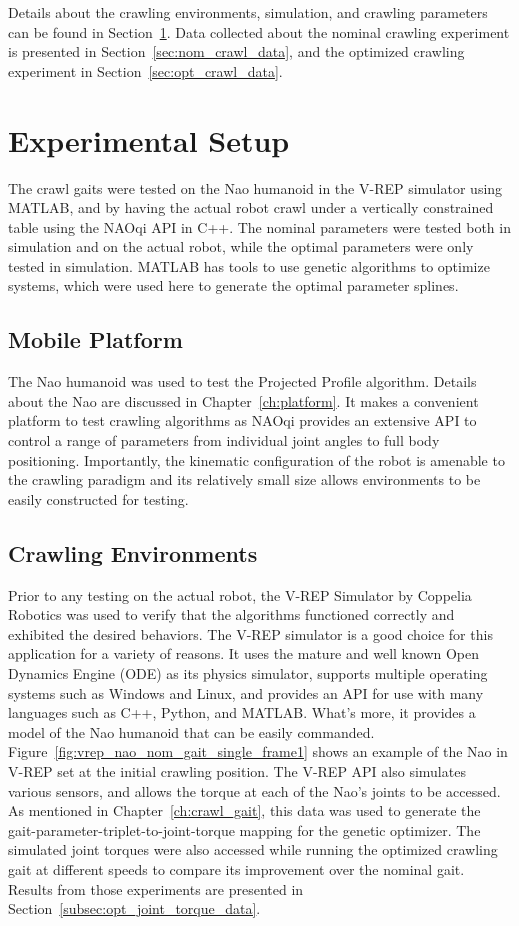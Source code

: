 Details about the crawling environments, simulation, and crawling parameters can be found in
Section~\ref{sec:crawl_exp_setup}. Data collected about the nominal crawling experiment is
presented in Section~\ref{sec:nom_crawl_data}, and the optimized crawling experiment in 
Section~\ref{sec:opt_crawl_data}.

\FloatBarrier
\section{Experimental Setup} \label{sec:crawl_exp_setup}
The crawl gaits were tested on the Nao humanoid in the V-REP simulator using MATLAB,
and by having the actual robot crawl under a vertically constrained table using the NAOqi API in C++.
The nominal parameters were tested both in simulation and on the actual robot, while
the optimal parameters were only tested in simulation. MATLAB has tools to use genetic
algorithms to optimize systems, which were used here to generate the optimal parameter
splines.

\subsection{Mobile Platform}
The Nao humanoid was used to test the Projected Profile algorithm.
Details about the Nao are discussed in Chapter~\ref{ch:platform}. It makes
a convenient platform to test crawling algorithms as NAOqi provides an extensive
API to control a range of parameters from individual joint angles to 
full body positioning. Importantly, the kinematic configuration of the robot is amenable 
to the crawling paradigm and its relatively small size allows environments to be
easily constructed for testing.

\subsection{Crawling Environments} \label{subsec:crawl_environments}
Prior to any testing on the actual robot, the V-REP Simulator by Coppelia Robotics was used
to verify that the algorithms functioned correctly and exhibited the desired behaviors.
The V-REP simulator is a good choice for this application for a variety of reasons.
It uses the mature and well known Open Dynamics Engine (ODE) as its physics simulator, supports multiple
operating systems such as Windows and Linux, and provides an API for use with many
languages such as C++, Python, and MATLAB\@. What's more, it provides a model of the Nao
humanoid that can be easily commanded.
Figure~\ref{fig:vrep_nao_nom_gait_single_frame1} shows an example of the Nao in V-REP
set at the initial crawling position.
The V-REP API also simulates various sensors, and allows the torque at each of the Nao's
joints to be accessed. As mentioned in Chapter~\ref{ch:crawl_gait}, this data was used
to generate the gait-parameter-triplet-to-joint-torque mapping for the genetic optimizer.
The simulated joint torques were also accessed while running the optimized crawling
gait at different speeds to compare its improvement over the nominal gait.
Results from those experiments are presented in Section~\ref{subsec:opt_joint_torque_data}.

